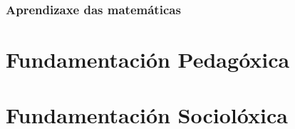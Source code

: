 \subsubsection{Aprendizaxe das matemáticas}



\section{Fundamentación Pedagóxica}


\section{Fundamentación Sociolóxica}
